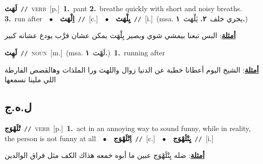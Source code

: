 \documentclass[10pt,a4paper,twoside]{article} %
\begin{document}
\begin{multicols}{2}
{\setlength\topsep{0pt}\textbf{\foreignlanguage{arabic}{لَهَث}}\ {\color{gray}\texttt{//}\color{black}}\ \textsc{verb}\ [p.]\ \textbf{1.}~pant  \textbf{2.}~breathe quickly with short and noisy breaths.  \textbf{3.}~run after\ \ $\bullet$\ \ \setlength\topsep{0pt}\textbf{\foreignlanguage{arabic}{اِلْهَث}}\ {\color{gray}\texttt{//}\color{black}}\ [c.]\ \ $\bullet$\ \ \setlength\topsep{0pt}\textbf{\foreignlanguage{arabic}{يِلْهَث}}\ {\color{gray}\texttt{//}\color{black}}\ [i.]\ \color{gray}(msa. \foreignlanguage{arabic}{يجري خلف}~\foreignlanguage{arabic}{\textbf{٢.}}  \foreignlanguage{arabic}{يَلْهَث}~\foreignlanguage{arabic}{\textbf{١.}})\color{black}\  \begin{flushright}\color{gray}\foreignlanguage{arabic}{\textbf{\underline{\foreignlanguage{arabic}{أمثلة}}}: البس تبعنا بيمشي شوي وبصير يِلْهَث يمكن عشان قرَّب يودع عشانه كبير}\end{flushright}\color{black}} \vspace{2mm}

{\setlength\topsep{0pt}\textbf{\foreignlanguage{arabic}{لَهِث}}\ {\color{gray}\texttt{//}\color{black}}\ \textsc{noun}\ [m.]\ \color{gray}(msa. \foreignlanguage{arabic}{لَهْث}~\foreignlanguage{arabic}{\textbf{١.}})\color{black}\ \textbf{1.}~running after\  \begin{flushright}\color{gray}\foreignlanguage{arabic}{\textbf{\underline{\foreignlanguage{arabic}{أمثلة}}}: الشيخ اليوم أعطانا خطبة عن الدنيا زوال واللهث ورا الملذات وهالقصص الفارطة اللي ملينا نسمعها}\end{flushright}\color{black}} \vspace{2mm}

\vspace{-3mm}
\subsection*{\color{blue}\foreignlanguage{arabic}{ل.ه.ج}\color{blue}{}} 

{\setlength\topsep{0pt}\textbf{\foreignlanguage{arabic}{تْلَهْوَج}}\ {\color{gray}\texttt{//}\color{black}}\ \textsc{verb}\ [p.]\ \textbf{1.}~act in an annoying way to sound funny, while in reality, the person is not funny at all\ \ $\bullet$\ \ \setlength\topsep{0pt}\textbf{\foreignlanguage{arabic}{اِتْلَهْوَج}}\ {\color{gray}\texttt{//}\color{black}}\ [c.]\ \ $\bullet$\ \ \setlength\topsep{0pt}\textbf{\foreignlanguage{arabic}{يِتْلَهْوَج}}\ {\color{gray}\texttt{//}\color{black}}\ [i.]\  \begin{flushright}\color{gray}\foreignlanguage{arabic}{\textbf{\underline{\foreignlanguage{arabic}{أمثلة}}}: ضله يِتْلَهْوَج عبين ما أبوه خمعه هذاك الكف مثل فراق الوالدين}\end{flushright}\color{black}} \vspace{2mm}


\end{multicols}
\end{document}
